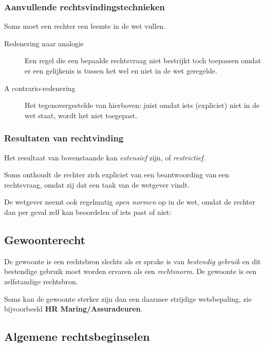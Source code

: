 \documentclass{article}
\begin{document}
\subsubsection{Aanvullende rechtsvindingstechnieken}

Soms moet een rechter een leemte in de wet vullen.

\begin{description} \item[Redenering naar analogie] Een regel die een bepaalde
  rechtsvraag niet bestrijkt toch toepassen omdat er een gelijkenis is tussen
het wel en niet in de wet geregelde. \item[A contrario-redenering] Het
  tegenovergestelde van hierboven: juist omdat iets (expliciet) niet in de wet
  staat, wordt het niet toegepast. \end{description}

\subsubsection{Resultaten van rechtvinding}

Het resultaat van bovenstaande kan \emph{extensief} zijn, of
\emph{restrictief}.

Soms onthoudt de rechter zich expliciet van een beantwoording van een
rechtsvraag, omdat zij dat een taak van de wetgever vindt.

De wetgever neemt ook regelmatig \emph{open normen} op in de wet, omdat de
rechter dan per geval zelf kan beoordelen of iets past of niet:

\subsection{Gewoonterecht}

De gewoonte is een rechtsbron slechts als er sprake is van \emph{bestendig
gebruik} en dit bestendige gebruik moet worden ervaren als een
\emph{rechtsnorm}. De gewoonte is een zelfstandige rechtsbron.

Soms kan de gewoonte sterker zijn dan een daarmee strijdige wetsbepaling, zie
bijvoorbeeld \textbf{HR Maring/Assuradeuren}.

\subsection{Algemene rechtsbeginselen}
\end{document}
